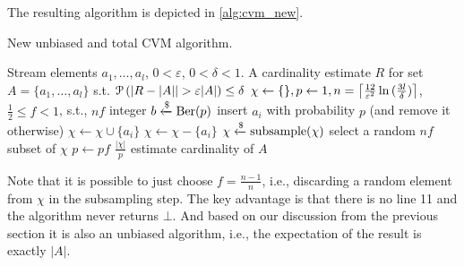 The resulting algorithm is depicted in \cref{alg:cvm_new}.
\begin{algorithm}[t]
	\caption{New unbiased and total CVM algorithm.}\label{alg:cvm_new}
	\begin{algorithmic}[1]
  \Require Stream elements $a_1,\dots,a_l$, $0 < \varepsilon$, $0 < \delta < 1$.
  \Ensure A cardinality estimate $R$ for set $A = \{ a_1,\dots,a_l \}$ s.t. $\prob \left( |R - |A| | > \varepsilon |A| \right) \leq \delta$
  \State $\chi \gets \{\}, p \gets 1, n = \ceil*{\frac{12}{\varepsilon^2} \ln{(\frac{3l}{\delta})} }$, $\frac{1}{2} \leq f < 1$, s.t., $nf$ integer
    \State $b \getsr \Ber(p)$ \Comment insert $a_i$ with probability $p$ (and remove it otherwise)
      \State $\chi \gets \chi \cup \{a_i\}$
    \Else
      \State $\chi \gets \chi - \{a_i\}$
    \EndIf
      \State $\chi \getsr \mathrm{subsample}(\chi)$ \Comment select a random $nf$ subset of $\chi$
      \State $p \gets pf$
    \EndIf
  \EndFor
  \State \Return $\frac{|\chi|}{p}$ \Comment estimate cardinality of $A$
  \end{algorithmic}
\end{algorithm}%
Note that it is possible to just choose $f = \frac{n-1}{n}$, i.e., discarding a random element from $\chi$ in the subsampling step.
The key advantage is that there is no line 11 and the algorithm never returns $\bot$.
And based on our discussion from the previous section it is also an unbiased algorithm, i.e., the expectation of the result is exactly $|A|$.

